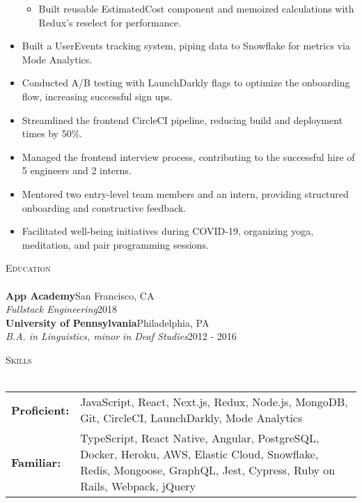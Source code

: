 \documentclass[a4paper]{article}
\newcommand{\header}[1]{
    {\hspace*{-18pt}\vspace*{3pt} \textcolor{deeppurple}{\textsc{#1}}}
    \vspace*{-12pt} \\
    \hspace*{-18pt} \textcolor{deeppurple}{\hrulefill} \\
}
\begin{document}
\begin{itemize}
\begin{itemize}
        \item Built reusable EstimatedCost component and memoized calculations with Redux's reselect for performance.
    \end{itemize}
    \item Built a UserEvents tracking system, piping data to Snowflake for metrics via Mode Analytics.
    \item Conducted A/B testing with LaunchDarkly flags to optimize the onboarding flow, increasing successful sign ups.
    \item Streamlined the frontend CircleCI pipeline, reducing build and deployment times by 50\%.
    \item Managed the frontend interview process, contributing to the successful hire of 5 engineers and 2 interns.
    \item Mentored two entry-level team members and an intern, providing structured onboarding and constructive feedback.
    \item Facilitated well-being initiatives during COVID-19, organizing yoga, meditation, and pair programming sessions.
\end{itemize}

\header{Education}
\textbf{App Academy}\hfill San Francisco, CA\\
\textit{Fullstack Engineering}\hfill 2018\\
\vspace{2mm}
\textbf{University of Pennsylvania}\hfill Philadelphia, PA\\
\textit{B.A. in Linguistics, minor in Deaf Studies}\hfill 2012 - 2016\\
\vspace{2mm}

\header{Skills}
\vspace{1mm}
\begin{tabular}{ l p{6in} }
    \hspace{-0.08in}\textbf{Proficient:} & JavaScript, React, Next.js, Redux, Node.js, MongoDB, Git, CircleCI, LaunchDarkly, Mode Analytics  \\
    \hspace{-0.08in}\textbf{Familiar:}   & TypeScript, React Native, Angular, PostgreSQL, Docker, Heroku, AWS, Elastic Cloud, Snowflake, Redis, Mongoose, GraphQL, Jest, Cypress, Ruby on Rails, Webpack, jQuery \\
\end{tabular}
\end{document}
